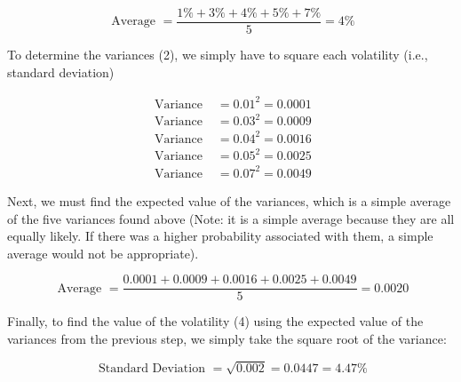 \documentclass[11pt]{article}
\begin{document}
$$
\text { Average }=\frac{1 \%+3 \%+4 \%+5 \%+7 \%}{5}=4 \%
$$

To determine the variances (2), we simply have to square each volatility (i.e., standard deviation)

$$
\begin{aligned}
\text { Variance } & =0.01^{2}=0.0001 \\
\text { Variance } & =0.03^{2}=0.0009 \\
\text { Variance } & =0.04^{2}=0.0016 \\
\text { Variance } & =0.05^{2}=0.0025 \\
\text { Variance } & =0.07^{2}=0.0049
\end{aligned}
$$

Next, we must find the expected value of the variances, which is a simple average of the five variances found above (Note: it is a simple average because they are all equally likely. If there was a higher probability associated with them, a simple average would not be appropriate).

$$
\text { Average }=\frac{0.0001+0.0009+0.0016+0.0025+0.0049}{5}=0.0020
$$

Finally, to find the value of the volatility (4) using the expected value of the variances from the previous step, we simply take the square root of the variance:

$$
\text { Standard Deviation }=\sqrt{0.002}=0.0447=4.47 \%
$$
\end{document}

